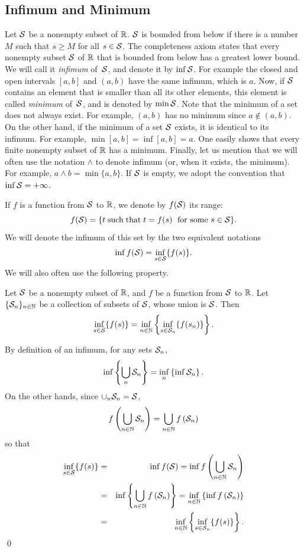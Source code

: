 \subsection{Infimum and Minimum}
Let $\mathcal S$ be a nonempty subset of $\mathbb{R}$.
$\mathcal S$ is bounded from below if there is a number~$M$ such that
$s \geq M$ for all $s \in \mathcal S$. The completeness axiom states
that every nonempty subset $\mathcal S$  of $\mathbb{R}$ that is bounded
from below has a greatest lower bound. We will call it {\em
infimum} of~$\mathcal S$, and denote it by $\inf \mathcal S$. For example
the closed and open intervals $[a,b]$ and $(a,b)$ have the same
infimum, which is $a$. Now, if $\mathcal S$ contains an element that is
smaller than all its other elements, this element is called
  {\em minimum} of~$\mathcal S$, and is denoted by $\min \mathcal S$. Note that the minimum of a set does not always
exist. For example, $(a,b)$ has no minimum since $a \notin  (a,b)$. On the other hand, if the
minimum of a set $\mathcal S$ exists, it is identical to its infimum. For example, $\min [a,b] = \inf [a,b] = a$.
One easily shows that every finite nonempty subset of $\mathbb{R}$ has a minimum.
Finally, let us mention that we will often use the notation $\wedge$ to denote infimum (or, when it
exists, the minimum). For example, $a \wedge b = \min \{ a, b \}$.
If  $\mathcal S$ is empty, we adopt the convention that $\inf \mathcal S = +\infty$.

If $f$ is a function from $\mathcal S$ to $\mathbb{R}$, we denote by $f(\mathcal S)$ its range:
$$ f(\mathcal S) = \{ t \mathrm{\; such \; that \; } t = f(s) \; \mbox{ for some } s \in \mathcal S \}. $$
We will denote the infimum of this set by the two equivalent notations
$$ \inf f(\mathcal S) = \inf_{s \in \mathcal S} \{ f(s) \}. $$
We will also often use the following property.
\begin{theorem}
Let $\mathcal S$ be a nonempty subset of $\mathbb{R}$, and $f$ be a function from $\mathcal S$ to $\mathbb{R}$.
Let $\{ \mathcal S_n \}_{n \in \mathbb{N}}$ be a collection of subsets of $\mathcal S$, whose union is $\mathcal S$. Then
$$ \inf_{s \in \mathcal S} \{ f(s) \} = \inf_{n \in \mathbb{N}} \left\{ \inf_{s \in \mathcal S_n} \{ f(s_n) \} \right\} . $$
\end{theorem}
\pr By definition of an infimum, for any sets $\mathcal S_n $,
$$ \inf \left\{ \bigcup_{n} \mathcal S_n \right\} = \inf_{n} \left\{ \inf  \mathcal S_n \right\}.$$
On the other hands, since $\cup_{n} \mathcal S_n = \mathcal S$,
$$ f \left( \bigcup_{n \in \mathbb{N}} \mathcal S_n \right) = \bigcup_{n \in \mathbb{N}} f \left( \mathcal S_n \right) $$
so that
\begin{eqnarray*}
\inf_{s \in \mathcal S} \{ f(s) \} & = & \inf  f(\mathcal S) =  \inf  f \left( \bigcup_{n \in \mathbb{N}} \mathcal S_n \right) \\
& = &  \inf \left\{ \bigcup_{n \in \mathbb{N}} f \left( \mathcal S_n \right) \right\} =
\inf_{n \in \mathbb{N}} \left\{ \inf f \left(  \mathcal S_n \right) \right\} \\
& = & \inf_{n \in \mathbb{N}} \left\{ \inf_{s \in \mathcal S_n} \{ f(s) \} \right\} .
\end{eqnarray*}
\qed
